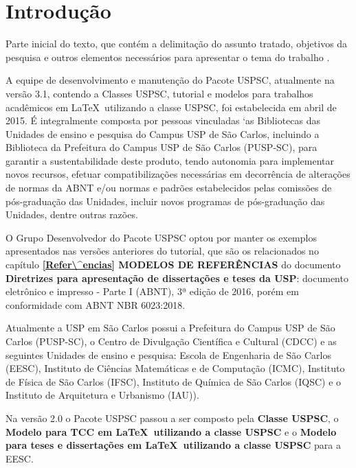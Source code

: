 
\chapter[Introdução]{Introdução}
\label{Introdução}

Parte inicial do texto, que cont\'em a delimitação do assunto tratado, objetivos da pesquisa e outros elementos necess\'arios para apresentar o tema do trabalho \cite{aguia2020}.

A equipe de desenvolvimento e manutenção do Pacote USPSC, atualmente na versão 3.1, contendo a Classes USPSC, tutorial e modelos para trabalhos acad\^emicos em \LaTeX\ utilizando a classe USPSC, foi estabelecida em abril de 2015. É integralmente composta por pessoas vinculadas `as Bibliotecas das Unidades de ensino e pesquisa do Campus USP de São Carlos, incluindo a Biblioteca da Prefeitura do Campus USP de São Carlos (PUSP-SC), para garantir a sustentabilidade deste produto, tendo autonomia para implementar novos recursos, efetuar compatibilizações necess\'arias em decorr\^encia de alterações de normas da ABNT e/ou normas e padrões estabelecidos pelas comissões de pós-graduação das Unidades, incluir novos programas de pós-graduação das Unidades, dentre outras razões.

O Grupo Desenvolvedor do Pacote USPSC optou por manter os exemplos apresentados nas versões anteriores do tutorial, que são os relacionados no capítulo \textbf{\ref{Refer\^encias} MODELOS DE REFERÊNCIAS} do documento \textbf{Diretrizes para apresentação de dissertações e teses da USP}: documento eletrônico e impresso - Parte I (ABNT), 3ª edição de 2016, por\'em em conformidade com ABNT NBR 6023:2018. 

Atualmente a USP em São Carlos possui a Prefeitura do Campus USP de São Carlos (PUSP-SC), o Centro de Divulgação Científica e Cultural (CDCC) e as seguintes Unidades de ensino e pesquisa: Escola de Engenharia de São Carlos (EESC), Instituto de Ci\^encias Matem\'aticas e de Computação (ICMC), Instituto de Física de São Carlos (IFSC), Instituto de Química de São Carlos (IQSC) e o Instituto de Arquitetura e Urbanismo (IAU)).

Na versão 2.0 o Pacote USPSC passou a ser composto pela \textbf{Classe USPSC}, o \textbf{Modelo para TCC em \LaTeX\ utilizando a classe USPSC} e o \textbf{Modelo para teses e dissertações em \LaTeX\ utilizando a classe USPSC} para a EESC.

